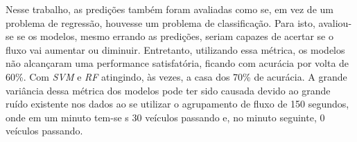 
Nesse trabalho, as predições também foram avaliadas como se, em vez de um problema de regressão, houvesse um problema de classificação. Para isto, avaliou-se se os modelos, mesmo errando as predições, seriam capazes de acertar se o fluxo vai aumentar ou diminuir. Entretanto, utilizando essa métrica, os modelos não alcançaram uma performance satisfatória, ficando com acurácia por volta de 60\%. Com \textit{\acrshort{SVM}} e \textit{\acrshort{RF}} atingindo, às vezes, a casa dos 70\% de acurácia. A grande variância dessa métrica dos modelos pode ter sido causada devido ao grande ruído existente nos dados ao se utilizar o agrupamento de fluxo de 150 segundos, onde em um minuto tem-se s 30 veículos passando e, no minuto seguinte, 0 veículos passando. 

